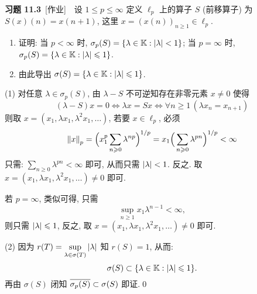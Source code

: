     \textbf{习题 11.3}\ [作业]\ \ 设 $ 1\leqslant p\leqslant\infty $ 定义 $ \ell_{p} $ 上的算子 $ S $ (前移算子) 为 $ S(x)(n)=x(n+1) $, 这里 $ x=(x(n))_{n\geqslant1}\in\ell_{p} $.
    \begin{enumerate}[(1)]
        \item 证明: 当 $ p<\infty $ 时, $ \sigma_{p}(S)=\{ \lambda\in\K:\abs{\lambda}<1 \} $; 当 $ p=\infty $ 时, $ \sigma_{p}(S)=\{ \lambda\in\K:\abs{\lambda}\leqslant1 \} $.
        \item 由此导出 $ \sigma(S)=\{ \lambda\in\K:\abs{\lambda}\leqslant1 \} $.
    \end{enumerate}
    \begin{Proof}
        (1) 对任意 $ \lambda\in\sigma_{p}(S) $, 由 $ \lambda-S $ 不可逆知存在非零元素 $ x\ne 0 $ 使得
        \[
            (\lambda-S)x=0\Longleftrightarrow \lambda x=Sx\Longleftrightarrow \forall n\geqslant1\,(\lambda x_{n}=x_{n+1})
        \]
        则取 $ x=(x_{1}, \lambda x_{1}, \lambda^{2}x_{1}, \dots) $, 若要 $ x\in\ell_{p} $, 必须
        \[
            \norm{x}_{p}=\Big( x_{1}^{p}\sum_{n\geqslant0}\lambda^{np} \Big)^{1/p}=x_{1}\Big( \sum_{n\geqslant0}\lambda^{pn} \Big)^{1/p}<\infty
        \]
        只需: $ \sum\limits_{n\geqslant0}\lambda^{pn}<\infty $ 即可, 从而只需 $ \abs{\lambda}<1 $. 反之. 取 $ x=(x_{1}, \lambda x_{1}, \lambda^{2}x_{1}, \dots)\ne0 $ 即可.

        若 $ p=\infty $, 类似可得, 只需
        \[
            \sup_{n\geqslant1}x_{1}\lambda^{n-1}<\infty,
        \]
        则只需 $ \abs{\lambda}\leqslant1 $, 反之, 取 $ x=(x_{1}, \lambda x_{1}, \lambda^{2}x_{1}, \dots)\ne 0 $ 即可.

        (2) 因为 $ r(T)=\sup\limits_{\lambda\in\sigma(T)}\abs{\lambda} $ 知 $ r(S)=1 $, 从而:
        \[
            \sigma(S)\subset\{ \lambda\in\K:\abs{\lambda}\leqslant1 \}.
        \]
        再由 $ \sigma(S) $ 闭知 $ \baro{\sigma_{p}(S)}\subset\sigma(S) $ 即证.\qed
    \end{Proof}

